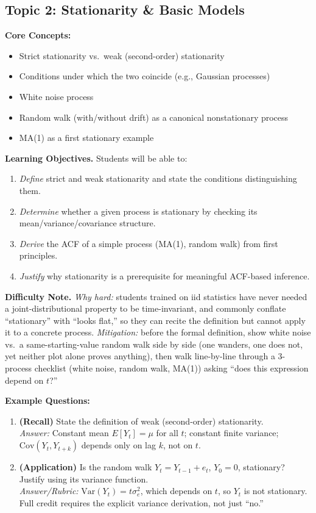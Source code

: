 \documentclass[11pt]{article}
\begin{document}
\subsection{Topic 2: Stationarity \& Basic Models}

\textbf{Core Concepts:}
\begin{itemize}
\item Strict stationarity vs.\ weak (second-order) stationarity
\item Conditions under which the two coincide (e.g., Gaussian processes)
\item White noise process
\item Random walk (with/without drift) as a canonical nonstationary process
\item MA(1) as a first stationary example
\end{itemize}

\textbf{Learning Objectives.} Students will be able to:
\begin{enumerate}
\item \emph{Define} strict and weak stationarity and state the conditions distinguishing them.
\item \emph{Determine} whether a given process is stationary by checking its mean/variance/covariance structure.
\item \emph{Derive} the ACF of a simple process (MA(1), random walk) from first principles.
\item \emph{Justify} why stationarity is a prerequisite for meaningful ACF-based inference.
\end{enumerate}

\textbf{Difficulty Note.} \emph{Why hard:} students trained on iid statistics have never needed a joint-distributional property to be time-invariant, and commonly conflate ``stationary'' with ``looks flat,'' so they can recite the definition but cannot apply it to a concrete process. \emph{Mitigation:} before the formal definition, show white noise vs.\ a same-starting-value random walk side by side (one wanders, one does not, yet neither plot alone proves anything), then walk line-by-line through a 3-process checklist (white noise, random walk, MA(1)) asking ``does this expression depend on $t$?''

\textbf{Example Questions:}
\begin{enumerate}
\item \textbf{(Recall)} State the definition of weak (second-order) stationarity. \\
\emph{Answer:} Constant mean $E[Y_t]=\mu$ for all $t$; constant finite variance; $\text{Cov}(Y_t,Y_{t+k})$ depends only on lag $k$, not on $t$.
\item \textbf{(Application)} Is the random walk $Y_t = Y_{t-1}+e_t$, $Y_0=0$, stationary? Justify using its variance function. \\
\emph{Answer/Rubric:} $\text{Var}(Y_t)=t\sigma_e^2$, which depends on $t$, so $Y_t$ is not stationary. Full credit requires the explicit variance derivation, not just ``no.''
\end{enumerate}
\end{document}

